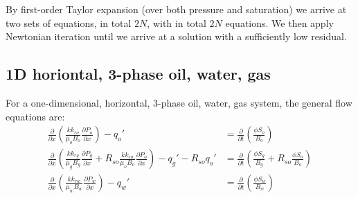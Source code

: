 By first-order Taylor expansion (over both pressure and saturation) we arrive at two sets of equations, in total $2N$, with in total $2N$ equations. We then apply Newtonian iteration until we arrive at a solution with a sufficiently low residual.



\clearpage
\subsection{1D horiontal, 3-phase oil, water, gas} %
\label{sub:1d_horiontal_3_phase_oil_water_gas}

\begin{question}
  For a one-dimensional, horizontal, 3-phase oil, water, gas system, the general flow equations are:
  \begin{align}
    \frac{\partial}{\partial x}\left(\frac{kk_{ro}}{\mu_{o}B_{o}}\frac{\partial P_{o}}{\partial x}\right)-q_{o}'
    &=\frac{\partial}{\partial t}\left(\frac{\phi S_{o}}{B_{o}}\right) \\
    \frac{\partial}{\partial x}\left(\frac{kk_{rg}}{\mu_{g}B_{g}}\frac{\partial P_{g}}{\partial x}+R_{so}\frac{kk_{ro}}{\mu_{o}B_{o}}\frac{\partial P_{o}}{\partial x}\right)-q_{g}'-R_{so}q_{o}'
    &=\frac{\partial}{\partial t}\left(\frac{\phi S_{g}}{B_{g}}+R_{so}\frac{\phi S_{o}}{B_{o}}\right) \\
    \frac{\partial}{\partial x}\left(\frac{kk_{rw}}{\mu_{w}B_{w}}\frac{\partial P_{w}}{\partial x}\right)-q_{w}'
    &=\frac{\partial}{\partial t}\left(\frac{\phi S_{w}}{B_{w}}\right) \\
  \end{align}
\end{question}

